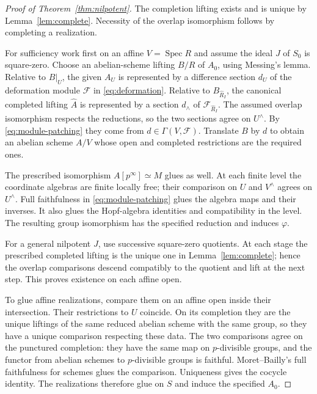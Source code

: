 \documentclass[11pt]{article}
\theoremstyle{definition}\newtheorem{definition}[theorem]{Definition}
\theoremstyle{remark}\newtheorem{remark}[theorem]{Remark}
\newcommand{\Spec}{\operatorname{Spec}}
\begin{document}
\begin{proof}[Proof of Theorem~\ref{thm:nilpotent}]
The completion lifting exists and is unique by Lemma~\ref{lem:complete}. Necessity of the overlap isomorphism follows by completing a realization.

For sufficiency work first on an affine $V=\Spec R$ and assume the ideal $J$ of $S_0$ is square-zero. Choose an abelian-scheme lifting $B/R$ of $A_0$, using Messing's lemma. Relative to $B|_U$, the given $A_U$ is represented by a difference section $d_U$ of the deformation module $\mathcal F$ in \eqref{eq:deformation}. Relative to $B_{\widehat R_I}$, the canonical completed lifting $\widehat A$ is represented by a section $d_\wedge$ of $\mathcal F_{\widehat R_I}$. The assumed overlap isomorphism respects the reductions, so the two sections agree on $U^\wedge$. By \eqref{eq:module-patching} they come from $d\in\Gamma(V,\mathcal F)$. Translate $B$ by $d$ to obtain an abelian scheme $A/V$ whose open and completed restrictions are the required ones.

The prescribed isomorphism $A[p^\infty]\simeq M$ glues as well. At each finite level the coordinate algebras are finite locally free; their comparison on $U$ and $V^\wedge$ agrees on $U^\wedge$. Full faithfulness in \eqref{eq:module-patching} glues the algebra maps and their inverses. It also glues the Hopf-algebra identities and compatibility in the level. The resulting group isomorphism has the specified reduction and induces $\varphi$.

For a general nilpotent $J$, use successive square-zero quotients. At each stage the prescribed completed lifting is the unique one in Lemma~\ref{lem:complete}; hence the overlap comparisons descend compatibly to the quotient and lift at the next step. This proves existence on each affine open.

To glue affine realizations, compare them on an affine open inside their intersection. Their restrictions to $U$ coincide. On its completion they are the unique liftings of the same reduced abelian scheme with the same group, so they have a unique comparison respecting these data. The two comparisons agree on the punctured completion: they have the same map on $p$-divisible groups, and the functor from abelian schemes to $p$-divisible groups is faithful. Moret--Bailly's full faithfulness for schemes \citep[Theorem~1.2, p.~565]{MoretBailly} glues the comparison. Uniqueness gives the cocycle identity. The realizations therefore glue on $S$ and induce the specified $A_0$.
\end{proof}
\end{document}
